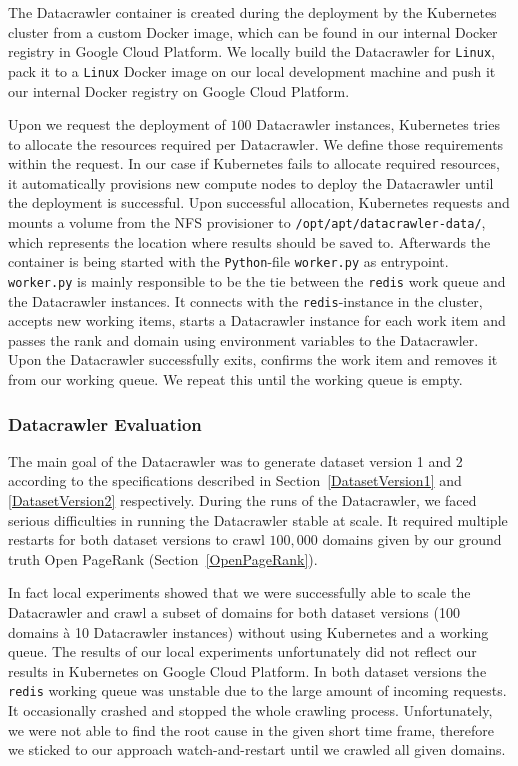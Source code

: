 The Datacrawler container is created during the deployment by the Kubernetes cluster from a custom Docker image, which can be found in our internal Docker registry in Google Cloud Platform. We locally build the Datacrawler for \texttt{Linux}, pack it to a \texttt{Linux} Docker image on our local development machine and push it our internal Docker registry on Google Cloud Platform. 

Upon we request the deployment of $100$ Datacrawler instances, Kubernetes tries to allocate the resources required per Datacrawler. We define those requirements within the request. In our case if Kubernetes fails to allocate required resources, it automatically provisions new compute nodes to deploy the Datacrawler until the deployment is successful. Upon successful allocation, Kubernetes requests and mounts a volume from the NFS provisioner to \texttt{/opt/apt/datacrawler-data/}, which represents the location where results should be saved to. Afterwards the container is being started with the \texttt{Python}-file \texttt{worker.py} as entrypoint. \texttt{worker.py} is mainly responsible to be the tie between the \texttt{redis} work queue and the Datacrawler instances. It connects with the \texttt{redis}-instance in the cluster, accepts new working items, starts a Datacrawler instance for each work item and passes the rank and domain using environment variables to the Datacrawler. Upon the Datacrawler successfully exits, confirms the work item and removes it from our working queue. We repeat this until the working queue is empty.

\subsubsection{Datacrawler Evaluation}
\label{datacrawler_results}
The main goal of the Datacrawler was to generate dataset version 1 and 2 according to the specifications described in Section~\ref{DatasetVersion1} and \ref{DatasetVersion2} respectively. During the runs of the Datacrawler, we faced serious difficulties in running the Datacrawler stable at scale. It required multiple restarts for both dataset versions to crawl $100,000$ domains given by our ground truth Open PageRank (Section~\ref{OpenPageRank}).

In fact local experiments showed that we were successfully able to scale the Datacrawler and crawl a subset of domains for both dataset versions (100 domains à 10 Datacrawler instances) without using Kubernetes and a working queue. The results of our local experiments unfortunately did not reflect our results in Kubernetes on Google Cloud Platform. In both dataset versions the \texttt{redis} working queue was unstable due to the large amount of incoming requests. It occasionally crashed and stopped the whole crawling process. Unfortunately, we were not able to find the root cause in the given short time frame, therefore we sticked to our approach watch-and-restart until we crawled all given domains.

